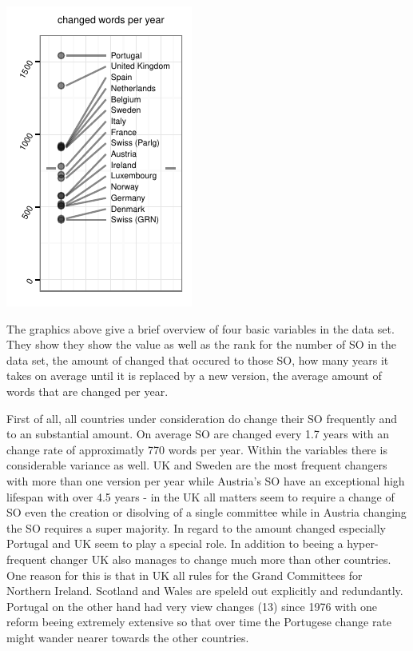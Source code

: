 \documentclass[a4paper]{article}
\begin{document}
\includegraphics{in_progress_files/figure-latex/unnamed-chunk-2-4.pdf}

The graphics above give a brief overview of four basic variables in the
data set. They show they show the value as well as the rank for the
number of SO in the data set, the amount of changed that occured to
those SO, how many years it takes on average until it is replaced by a
new version, the average amount of words that are changed per year.

First of all, all countries under consideration do change their SO
frequently and to an substantial amount. On average SO are changed every
1.7 years with an change rate of approximatly 770 words per year. Within
the variables there is considerable variance as well. UK and Sweden are
the most frequent changers with more than one version per year while
Austria's SO have an exceptional high lifespan with over 4.5 years - in
the UK all matters seem to require a change of SO even the creation or
disolving of a single committee while in Austria changing the SO
requires a super majority. In regard to the amount changed especially
Portugal and UK seem to play a special role. In addition to beeing a
hyper-frequent changer UK also manages to change much more than other
countries. One reason for this is that in UK all rules for the Grand
Committees for Northern Ireland. Scotland and Wales are speleld out
explicitly and redundantly. Portugal on the other hand had very view
changes (13) since 1976 with one reform beeing extremely extensive so
that over time the Portugese change rate might wander nearer towards the
other countries.
\end{document}
